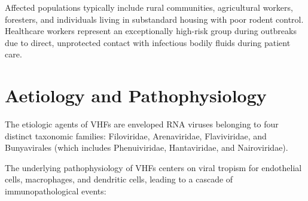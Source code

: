 Affected populations typically include rural communities, agricultural workers, foresters, and individuals living in substandard housing with poor rodent control. Healthcare workers represent an exceptionally high-risk group during outbreaks due to direct, unprotected contact with infectious bodily fluids during patient care.

\section*{Aetiology and Pathophysiology}
The etiologic agents of VHFs are enveloped RNA viruses belonging to four distinct taxonomic families: Filoviridae, Arenaviridae, Flaviviridae, and Bunyavirales (which includes Phenuiviridae, Hantaviridae, and Nairoviridae).

The underlying pathophysiology of VHFs centers on viral tropism for endothelial cells, macrophages, and dendritic cells, leading to a cascade of immunopathological events:

